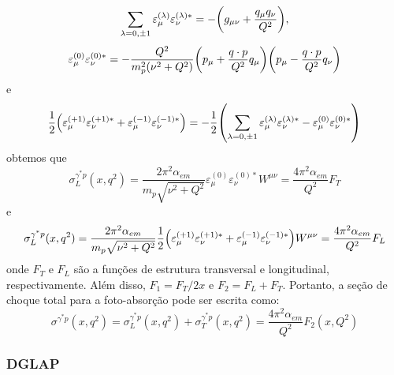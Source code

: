 \begin{equation}
    \sum_{\lambda=0,\pm 1} \varepsilon^{(\lambda)}_\mu \varepsilon^{(\lambda)*}_\nu  = - \qty(g_{\mu\nu} + \frac{q_{\mu}q_{\nu}}{Q^2}),
\end{equation}
\begin{equation}
    \varepsilon^{(0)}_\mu \varepsilon^{(0)*}_\nu  = - \frac{Q^2}{m_p^2(\nu^2 +Q^2)}\qty(p_{\mu} + \frac{q\cdot p}{Q^2}q_\mu)\qty(p_{\mu} - \frac{q\cdot p}{Q^2}q_\nu)
\end{equation}
e
\begin{equation}
   \frac{1}{2} \qty(\varepsilon^{(+1)}_\mu \varepsilon^{(+1)*}_\nu + \varepsilon^{(-1)}_\mu \varepsilon^{(-1)*}_\nu)  = - \frac{1}{2}\qty(\sum_{\lambda=0,\pm 1} \varepsilon^{(\lambda)}_\mu \varepsilon^{(\lambda)*}_\nu -   \varepsilon^{(0)}_\mu \varepsilon^{(0)*}_\nu)
\end{equation}
obtemos que 
\begin{equation}
     \sigma ^{\gamma^* p}_L (x, q^2) = \frac{2\pi^2 \alpha_{em}}{m_p\sqrt{\nu^2 + Q^2}} \varepsilon^{(0)}_\mu \varepsilon_\nu^{(0)*} W^{\mu\nu} = \frac{4\pi^2\alpha_{em}}{Q^2}F_T
\end{equation}
e 
\begin{equation}
     \sigma ^{\gamma^* p}_L (x, q^2) = \frac{2\pi^2 \alpha_{em}}{m_p\sqrt{\nu^2 + Q^2}} \frac{1}{2}\qty(\varepsilon^{(+1)}_\mu \varepsilon_\nu^{(+1)*} + \varepsilon^{(-1)}_\mu \varepsilon_\nu^{(-1)*} ) W^{\mu\nu} = \frac{4\pi^2\alpha_{em}}{Q^2}F_L
\end{equation}
onde $F_T$ e $F_L$ são a funções de estrutura transversal e longitudinal, respectivamente.  Além disso, $F_1 = F_T/2x$  e $F_2 = F_L + F_T$. Portanto, a seção de choque total para a foto-absorção pode ser escrita como:
\begin{equation}
      \sigma ^{\gamma^* p} (x, q^2)  =   \sigma ^{\gamma^* p}_L (x, q^2)  +  \sigma ^{\gamma^* p}_T (x, q^2)  = \frac{4\pi ^2\alpha_ {em}}{Q^2}F_ 2(x, Q^2)
\end{equation}
\subsubsection{DGLAP}


